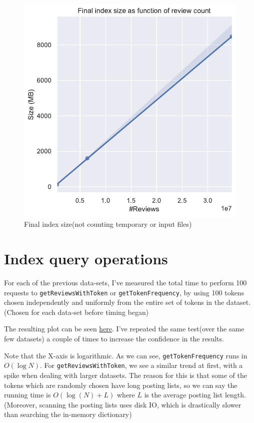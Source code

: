\documentclass[11pt]{article}
\begin{document}
\begin{figure}[!htb]
	\caption{Final index size(not counting temporary or input files)}
	\label{fig:finalsize}
	\centering
	\includegraphics[width=\textwidth,height=\textheight,keepaspectratio]{diskusage2.pdf}
\end{figure}

\section{Index query operations}

For each of the previous data-sets, I've measured the total time to perform 100 requests to \texttt{getReviewsWithToken} or \texttt{getTokenFrequency}, by using 100 tokens chosen independently and uniformly from the entire set of tokens in the dataset.(Chosen for each data-set before timing began)


The resulting plot can be seen \hyperref[fig:ops]{here}. I've repeated the same test(over the same few datasets) a couple of times to increase the
confidence in the results. 

Note that the X-axis is logarithmic. As we can see, \texttt{getTokenFrequency} runs in $O(\log N)$. For \texttt{getReviewsWithToken}, we see
a similar trend at first, with a spike when dealing with larger datasets. The reason for this is that some of the tokens which are randomly chosen have
long posting lists, so we can say the running time is $O(\log (N) + L)$ where $L$ is the average posting list length. (Moreover, scanning the posting lists
uses disk IO, which is drastically slower than searching the in-memory dictionary)
\end{document}
